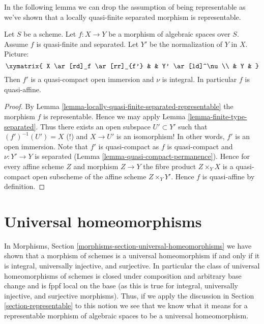 \noindent
In the following lemma we can drop the assumption of being
representable as we've shown that a locally quasi-finite
separated morphism is representable.

\begin{lemma}
\label{lemma-quasi-finite-separated-quasi-affine}
Let $S$ be a scheme.
Let $f : X \to Y$ be a morphism of algebraic spaces over $S$.
Assume $f$ is quasi-finite and separated.
Let $Y'$ be the normalization of $Y$ in $X$.
Picture:
$$
\xymatrix{
X \ar[rd]_f \ar[rr]_{f'} & & Y' \ar[ld]^\nu \\
& Y &
}
$$
Then $f'$ is a quasi-compact open immersion and $\nu$ is integral.
In particular $f$ is quasi-affine.
\end{lemma}

\begin{proof}
By Lemma \ref{lemma-locally-quasi-finite-separated-representable}
the morphism $f$ is representable. Hence we may apply
Lemma \ref{lemma-finite-type-separated}. Thus there exists an open
subspace $U' \subset Y'$ such that
$(f')^{-1}(U') = X$ (!) and $X \to U'$ is an isomorphism! In other
words, $f'$ is an open immersion. Note that $f'$ is quasi-compact as
$f$ is quasi-compact and $\nu : Y' \to Y$ is separated
(Lemma \ref{lemma-quasi-compact-permanence}).
Hence for every affine scheme $Z$ and morphism $Z \to Y$ the
fibre product $Z \times_Y X$ is a quasi-compact open subscheme
of the affine scheme $Z \times_Y Y'$. Hence $f$ is quasi-affine by
definition.
\end{proof}








\section{Universal homeomorphisms}
\label{section-universal-homeomorphisms}

\noindent
In
Morphisms, Section \ref{morphisms-section-universal-homeomorphisms}
we have shown that a morphism of schemes is a universal homeomorphism
if and only if it is integral, universally injective, and surjective.
In particular the class of universal homeomorphisms of schemes
is closed under composition and arbitrary base change and is fppf local
on the base (as this is true for integral, universally injective, and
surjective morphisms). Thus, if we apply the discussion in
Section \ref{section-representable}
to this notion we see that we know what it means for a representable
morphism of algebraic spaces to be a universal homeomorphism.

